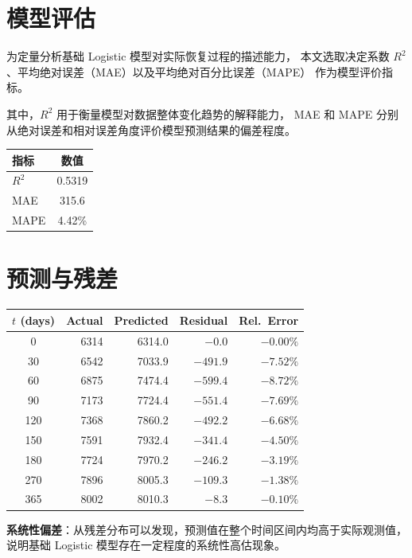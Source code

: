 \documentclass[12pt,a4paper]{article}
\begin{document}
\section{模型评估}

为定量分析基础 Logistic 模型对实际恢复过程的描述能力，
本文选取决定系数 $R^2$、平均绝对误差（MAE）以及平均绝对百分比误差（MAPE）
作为模型评价指标。

其中，$R^2$ 用于衡量模型对数据整体变化趋势的解释能力，
MAE 和 MAPE 分别从绝对误差和相对误差角度评价模型预测结果的偏差程度。

\begin{center}
\begin{tabular}{lc}
\toprule
指标 & 数值 \\
\midrule
$R^2$  & 0.5319 \\
MAE    & 315.6 \\
MAPE   & 4.42\% \\
\bottomrule
\end{tabular}
\end{center}

\section{预测与残差}

\begin{center}
\begin{tabular}{crrrr}
\toprule
$t$ (days) & Actual & Predicted & Residual & Rel.\ Error \\
\midrule
0   & 6314 & 6314.0 & $-0.0$   & $-0.00\%$ \\
30  & 6542 & 7033.9 & $-491.9$ & $-7.52\%$ \\
60  & 6875 & 7474.4 & $-599.4$ & $-8.72\%$ \\
90  & 7173 & 7724.4 & $-551.4$ & $-7.69\%$ \\
120 & 7368 & 7860.2 & $-492.2$ & $-6.68\%$ \\
150 & 7591 & 7932.4 & $-341.4$ & $-4.50\%$ \\
180 & 7724 & 7970.2 & $-246.2$ & $-3.19\%$ \\
270 & 7896 & 8005.3 & $-109.3$ & $-1.38\%$ \\
365 & 8002 & 8010.3 & $-8.3$   & $-0.10\%$ \\
\bottomrule
\end{tabular}
\end{center}

\textbf{系统性偏差}：从残差分布可以发现，预测值在整个时间区间内均高于实际观测值，
说明基础 Logistic 模型存在一定程度的系统性高估现象。
\end{document}
